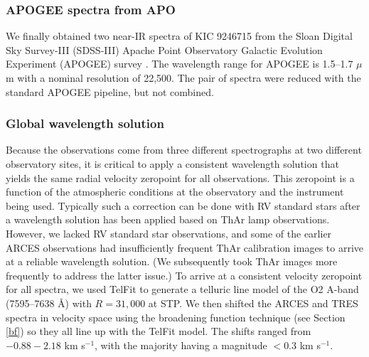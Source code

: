 \subsubsection{APOGEE spectra from APO}\label{apogee}
We finally obtained two near-IR spectra of KIC 9246715 from the Sloan Digital Sky Survey-III (SDSS-III) Apache Point Observatory Galactic Evolution Experiment (APOGEE) survey \citep{2015arXiv150100963A}. The wavelength range for APOGEE is 1.5--1.7 $\mu$m with a nominal resolution of 22,500. The pair of spectra were reduced with the standard APOGEE pipeline, but not combined.

\subsubsection{Global wavelength solution}\label{wavelength}
Because the observations come from three different spectrographs at two different observatory sites, it is critical to apply a consistent wavelength solution that yields the same radial velocity zeropoint for all observations. This zeropoint is a function of the atmospheric conditions at the observatory and the instrument being used. Typically such a correction can be done with RV standard stars after a wavelength solution has been applied based on ThAr lamp observations. However, we lacked RV standard star observations, and some of the earlier ARCES observations had insufficiently frequent ThAr calibration images to arrive at a reliable wavelength solution. (We subsequently took ThAr images more frequently to address the latter issue.) To arrive at a consistent velocity zeropoint for all spectra, we used TelFit \citep{gul14} to generate a telluric line model of the O2 A-band (7595--7638 \AA) with $R = 31,000$ at STP. We then shifted the ARCES and TRES spectra in velocity space using the broadening function technique (see Section \ref{bf}) so they all line up with the TelFit model. The shifts ranged from $-0.88 - 2.18$ km s$^{-1}$, with the majority having a magnitude $< 0.3$ km s$^{-1}$.
  
  
  